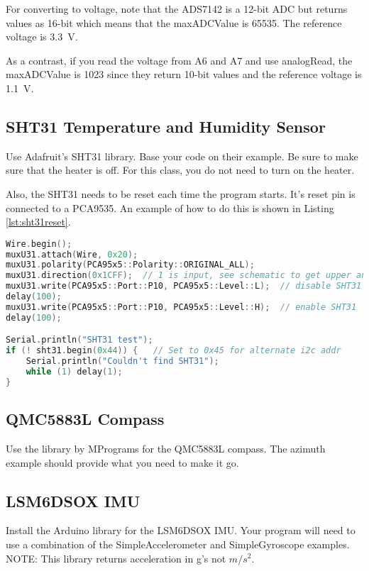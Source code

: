 For converting to voltage, note that the ADS7142 is a 12-bit ADC but returns values 
as 16-bit which means that the maxADCValue is 65535. The reference voltage is 3.3~V.

As a contrast, if you read the voltage from A6 and A7 and use analogRead, the 
maxADCValue is 1023 since they return 10-bit values and the reference voltage 
is 1.1~V.

\subsection{SHT31 Temperature and Humidity Sensor}
Use Adafruit's SHT31 library. Base your code on their example. Be sure 
to make sure that the heater is off. For this class, you do not need to 
turn on the heater.

Also, the SHT31 needs to be reset each time the program starts. It's 
reset pin is connected to a PCA9535. An example of how to do this
is shown in Listing \ref{lst:sht31reset}.

\begin{lstlisting}[caption={This listing shows how to reset the SHT31.},
label={lst:sht31reset},language=C++]
Wire.begin();
muxU31.attach(Wire, 0x20);
muxU31.polarity(PCA95x5::Polarity::ORIGINAL_ALL);
muxU31.direction(0x1CFF);  // 1 is input, see schematic to get upper and lower bytes
muxU31.write(PCA95x5::Port::P10, PCA95x5::Level::L);  // disable SHT31
delay(100);
muxU31.write(PCA95x5::Port::P10, PCA95x5::Level::H);  // enable SHT31
delay(100);

Serial.println("SHT31 test");
if (! sht31.begin(0x44)) {   // Set to 0x45 for alternate i2c addr
    Serial.println("Couldn't find SHT31");
    while (1) delay(1);
}
\end{lstlisting}

\subsection{QMC5883L Compass}
Use the library by MPrograms for the QMC5883L compass. The azimuth example 
should provide what you need to make it go.

\subsection{LSM6DSOX IMU}
Install the Arduino library for the LSM6DSOX IMU. Your program will need 
to use a combination of the SimpleAccelerometer and SimpleGyroscope examples.
NOTE: This library returns acceleration in g's not $m/s^2$.

